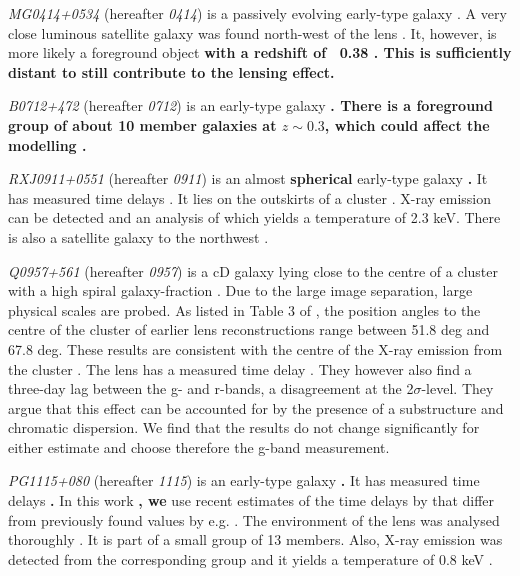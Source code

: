 \documentclass[useAMS,usenatbib]{mn2e}
\newcommand{\cb}[1]{{\color{red} \textbf{#1}}}
\begin{document}
\textit{MG0414+0534} (hereafter \textit{0414}) is a passively evolving early-type galaxy \citep{1999AJ....117.2034T}. A very close luminous satellite galaxy was found north-west of the lens \citep{1993AJ....105....1S}. It, however, is more likely a foreground object \cb{with a redshift of ~0.38 \citep{2011MNRAS.413L..86C}. This is sufficiently distant to still contribute to the lensing effect.}

\textit{B0712+472} (hereafter \textit{0712}) is an early-type galaxy \cb{\citep{1998MNRAS.296..483J,1998AJ....115..377F}. There is a foreground group of about 10 member galaxies at $z\sim0.3$, which could affect the modelling \citep{2002AJ....123..627F}.}

\textit{RXJ0911+0551} (hereafter \textit{0911}) is an almost \cb{spherical} early-type galaxy \cb{\citep{1997A&A...317L..13B,2012A&A...538A..99S}.} It has measured time delays \citep{2002ApJ...572L..11H}. It lies on the outskirts of a cluster \citep{2001ApJ...555....1M}. X-ray emission can be detected and an analysis of which yields a temperature of 2.3 keV. There is also a satellite galaxy to the northwest \citep{2000ApJ...544L..35K}.

\textit{Q0957+561} (hereafter \textit{0957}) is a cD galaxy lying close to the centre of a cluster with a high spiral galaxy-fraction \citep[e.g.][]{1992MNRAS.254P..27G,1994A&A...291..411A,1998ApJ...504..661C}. Due to the large image separation, large physical scales are probed. As listed in Table 3 of \cite{2000ApJ...542...74K}, the position angles to the centre of the cluster of earlier lens reconstructions range between 51.8 deg and 67.8 deg. These results are consistent with the centre of the X-ray emission from the cluster \citep{1998ApJ...504..661C}. The lens has a measured time delay \citep[e.g.][]{2012A&A...540A.132S}. They however also find a three-day lag between the g- and r-bands, a disagreement at the 2$\sigma$-level. They argue that this effect can be accounted for by the presence of a substructure and chromatic dispersion. We find that the results do not change significantly for either estimate and choose therefore the g-band measurement.

\textit{PG1115+080} (hereafter \textit{1115}) is an early-type galaxy \cb{\citep{1980Natur.285..641W,2005ApJ...626...51Y}.} It has measured time delays \cb{\citep[see e.g.][]{1997ApJ...475L..85S}.} In this work\cb{, we} use recent estimates of the time delays by \cite{2010MNRAS.406.2764T} that differ from previously found values by e.g. \cite{1997ApJ...489...21B}. The environment of the lens was analysed thoroughly \citep{2006ApJ...641..169M,2011ApJ...726...84W}. It is part of a small group of 13 members. Also, X-ray emission was detected from the corresponding group and it yields a temperature of 0.8 keV \citep{2004ApJ...610..686G}.
\end{document}
